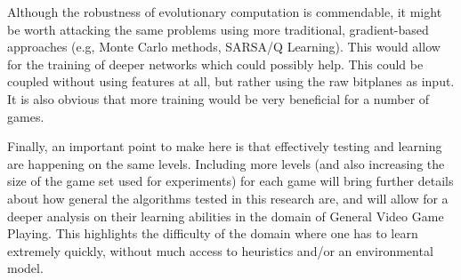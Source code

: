 \documentclass[conference]{IEEEtran}
\begin{document}
Although the robustness of evolutionary computation is commendable, it might be worth attacking the same problems using more traditional, gradient-based approaches (e.g, Monte Carlo methods, SARSA/Q Learning). This would allow for the training of deeper networks which could possibly help. This could be coupled without using features at all, but rather using the raw bitplanes as input. It is also obvious that more training would be very beneficial for a number of games. 

Finally, an important point to make here is that effectively testing and learning are happening on the same levels. Including more levels (and also increasing the size of the game set used for experiments) for each game will bring further details about how general the algorithms tested in this research are, and will allow for a deeper analysis on their learning abilities in the domain of General Video Game Playing. This highlights the  difficulty of the domain where one has to learn extremely quickly, without much access to heuristics and/or an environmental model. 


 

 



\end{document}
